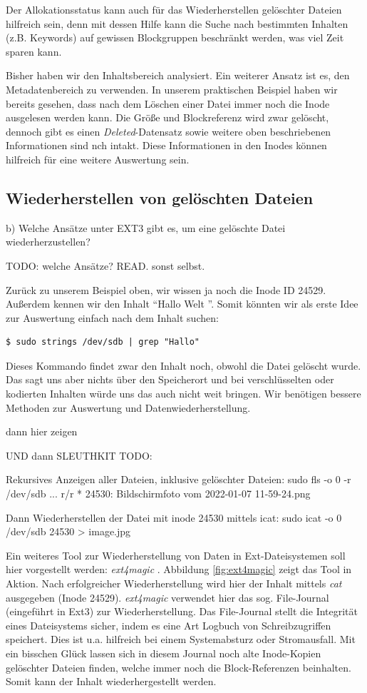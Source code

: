 Der Allokationsstatus kann auch für das Wiederherstellen gelöschter Dateien hilfreich sein, denn mit dessen Hilfe kann die Suche nach bestimmten Inhalten (z.B. Keywords) auf gewissen Blockgruppen beschränkt werden, was viel Zeit sparen kann. 

Bisher haben wir den Inhaltsbereich analysiert. Ein weiterer Ansatz ist es, den Metadatenbereich zu verwenden. In unserem praktischen Beispiel haben wir bereits gesehen, dass nach dem Löschen einer Datei immer noch die Inode ausgelesen werden kann. Die Größe und Blockreferenz wird zwar gelöscht, dennoch gibt es einen \textit{Deleted}-Datensatz sowie weitere oben beschriebenen Informationen sind nch intakt. Diese Informationen in den Inodes können hilfreich für eine weitere Auswertung sein.


\subsection{Wiederherstellen von gelöschten Dateien}
b) Welche Ansätze unter EXT3 gibt es, um eine gelöschte Datei wiederherzustellen?

TODO: welche Ansätze? READ. sonst selbst.

Zurück zu unserem Beispiel oben, wir wissen ja noch die Inode ID 24529. Außerdem kennen wir den Inhalt "`Hallo Welt "'. Somit könnten wir als erste Idee zur Auswertung einfach nach dem Inhalt suchen:

\begin{lstlisting}
$ sudo strings /dev/sdb | grep "Hallo"
\end{lstlisting}
 
Dieses Kommando findet zwar den Inhalt noch, obwohl die Datei gelöscht wurde. Das sagt uns aber nichts über den Speicherort  und bei verschlüsselten oder kodierten Inhalten würde uns das auch nicht weit bringen. Wir benötigen bessere Methoden zur Auswertung und Datenwiederherstellung.

 
dann  hier zeigen

UND dann SLEUTHKIT TODO: \cite{RecoverTSK.07.01.2022}

Rekursives Anzeigen aller Dateien, inklusive gelöschter Dateien:
sudo fls -o 0 -r /dev/sdb
...
r/r * 24530:	Bildschirmfoto vom 2022-01-07 11-59-24.png

Dann Wiederherstellen der Datei mit inode 24530 mittels icat:
sudo icat -o 0 /dev/sdb 24530 > image.jpg


Ein weiteres Tool zur Wiederherstellung von Daten in Ext-Dateisystemen soll hier vorgestellt werden: \textit{ext4magic} \cite{Ext4magic.07.01.2022}.
Abbildung \ref{fig:ext4magic} zeigt das Tool in Aktion. Nach erfolgreicher Wiederherstellung wird hier der Inhalt mittels \textit{cat} ausgegeben (Inode 24529). \textit{ext4magic} verwendet hier das sog. File-Journal (eingeführt in Ext3) zur Wiederherstellung. Das File-Journal stellt die Integrität eines Dateisystems sicher, indem es eine Art Logbuch von Schreibzugriffen speichert. Dies ist u.a. hilfreich bei einem Systemabsturz oder Stromausfall. Mit ein bisschen Glück lassen sich in diesem Journal noch alte Inode-Kopien gelöschter Dateien finden, welche immer noch die Block-Referenzen beinhalten. Somit kann der Inhalt wiederhergestellt werden.


